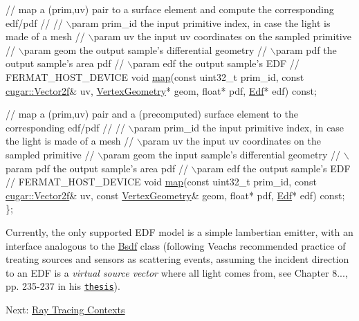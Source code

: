 \begin{DoxyParagraph}{}
\begin{DoxyCode}
   \textcolor{comment}{// map a (prim,uv) pair to a surface element and compute the corresponding edf/pdf}
   \textcolor{comment}{//}
   \textcolor{comment}{// \(\backslash\)param prim\_id       the input primitive index, in case the light is made of a mesh}
   \textcolor{comment}{// \(\backslash\)param uv            the input uv coordinates on the sampled primitive}
   \textcolor{comment}{// \(\backslash\)param geom          the output sample's differential geometry}
   \textcolor{comment}{// \(\backslash\)param pdf           the output sample's area pdf}
   \textcolor{comment}{// \(\backslash\)param edf           the output sample's EDF}
   \textcolor{comment}{//}
   FERMAT\_HOST\_DEVICE
   \textcolor{keywordtype}{void} \hyperlink{group___lights_module_gaf14a70f7d23b422f8953bc55d1eade44}{map}(\textcolor{keyword}{const} uint32\_t prim\_id, \textcolor{keyword}{const} \hyperlink{structcugar_1_1_vector}{cugar::Vector2f}& uv, 
      \hyperlink{struct_vertex_geometry}{VertexGeometry}* geom, \textcolor{keywordtype}{float}* pdf, \hyperlink{struct_edf}{Edf}* edf) \textcolor{keyword}{const};

   \textcolor{comment}{// map a (prim,uv) pair and a (precomputed) surface element to the corresponding edf/pdf}
   \textcolor{comment}{//}
   \textcolor{comment}{// \(\backslash\)param prim\_id       the input primitive index, in case the light is made of a mesh}
   \textcolor{comment}{// \(\backslash\)param uv            the input uv coordinates on the sampled primitive}
   \textcolor{comment}{// \(\backslash\)param geom          the input sample's differential geometry}
   \textcolor{comment}{// \(\backslash\)param pdf           the output sample's area pdf}
   \textcolor{comment}{// \(\backslash\)param edf           the output sample's EDF}
   \textcolor{comment}{//}
   FERMAT\_HOST\_DEVICE
   \textcolor{keywordtype}{void} \hyperlink{group___lights_module_gaf14a70f7d23b422f8953bc55d1eade44}{map}(\textcolor{keyword}{const} uint32\_t prim\_id, \textcolor{keyword}{const} \hyperlink{structcugar_1_1_vector}{cugar::Vector2f}& uv, \textcolor{keyword}{const} 
      \hyperlink{struct_vertex_geometry}{VertexGeometry}& geom, \textcolor{keywordtype}{float}* pdf, \hyperlink{struct_edf}{Edf}* edf) \textcolor{keyword}{const};
\};
\end{DoxyCode}
 
\end{DoxyParagraph}
\begin{DoxyParagraph}{}
Currently, the only supported E\+DF model is a simple lambertian emitter, with an interface analogous to the \hyperlink{struct_bsdf}{Bsdf} class (following Veach\textquotesingle{}s recommended practice of treating sources and sensors as scattering events, assuming the incident direction to an E\+DF is a {\itshape virtual source vector} where all light comes from, see Chapter 8..., pp. 235-\/237 in his \href{http://graphics.stanford.edu/papers/veach_thesis/}{\tt thesis}).
\end{DoxyParagraph}
Next\+: \hyperlink{_r_t_context_page}{Ray Tracing Contexts} 